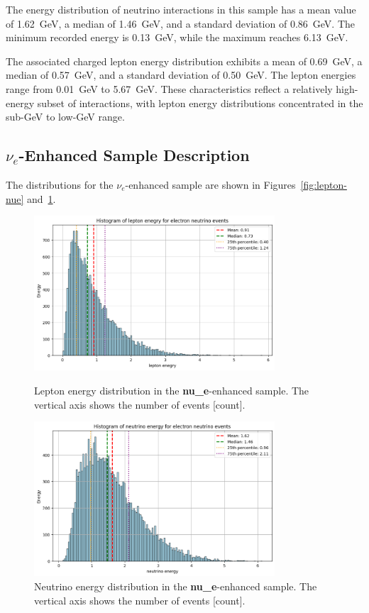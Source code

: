 \documentclass{pracalicmgr}
\begin{document}
The energy distribution of neutrino interactions in this sample has a mean value of 1.62~GeV, a median of 1.46~GeV, and a standard deviation of 0.86~GeV. The minimum recorded energy is 0.13~GeV, while the maximum reaches 6.13~GeV.

The associated charged lepton energy distribution exhibits a mean of 0.69~GeV, a median of 0.57~GeV, and a standard deviation of 0.50~GeV. The lepton energies range from 0.01~GeV to 5.67~GeV. These characteristics reflect a relatively high-energy subset of interactions, with lepton energy distributions concentrated in the sub-GeV to low-GeV range.

\subsection{\texorpdfstring{$\nu_e$}{νₑ}-Enhanced Sample Description}

The distributions for the $\nu_e$-enhanced sample are shown in Figures~\ref{fig:lepton-nue} and~\ref{fig:neutrino-nue}.

\begin{figure}[H]
    \centering
    \begin{minipage}[t]{0.48\textwidth}
        \centering
        \includegraphics[width=0.8\textwidth]{src/leptonMuon.png}
        \caption{Lepton energy distribution in the \textbf{nu\_e}-enhanced sample. The vertical axis shows the number of events [count].}
        \label{fig:lepton-nue}
    \end{minipage}
    \hfill
    \begin{minipage}[t]{0.48\textwidth}
    \centering
    \includegraphics[width=0.8\textwidth]{src/neutrinoMuon.png}
    \caption{Neutrino energy distribution in the \textbf{nu\_e}-enhanced sample. The vertical axis shows the number of events [count].}
    \label{fig:neutrino-nue}
    \end{minipage}
\end{figure}
\end{document}
